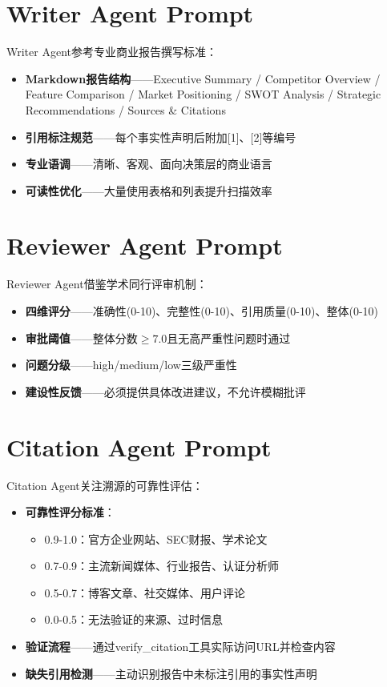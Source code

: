 \documentclass[12pt,a4paper]{ctexrep}
\begin{document}
\section{Writer Agent Prompt}

Writer Agent参考专业商业报告撰写标准：

\begin{itemize}
\item \textbf{Markdown报告结构}——Executive Summary / Competitor Overview / Feature Comparison / Market Positioning / SWOT Analysis / Strategic Recommendations / Sources \& Citations
\item \textbf{引用标注规范}——每个事实性声明后附加[1]、[2]等编号
\item \textbf{专业语调}——清晰、客观、面向决策层的商业语言
\item \textbf{可读性优化}——大量使用表格和列表提升扫描效率
\end{itemize}

\section{Reviewer Agent Prompt}

Reviewer Agent借鉴学术同行评审机制：

\begin{itemize}
\item \textbf{四维评分}——准确性(0-10)、完整性(0-10)、引用质量(0-10)、整体(0-10)
\item \textbf{审批阈值}——整体分数$\geq 7.0$且无高严重性问题时通过
\item \textbf{问题分级}——high/medium/low三级严重性
\item \textbf{建设性反馈}——必须提供具体改进建议，不允许模糊批评
\end{itemize}

\section{Citation Agent Prompt}

Citation Agent关注溯源的可靠性评估：

\begin{itemize}
\item \textbf{可靠性评分标准}：
\begin{itemize}
\item 0.9-1.0：官方企业网站、SEC财报、学术论文
\item 0.7-0.9：主流新闻媒体、行业报告、认证分析师
\item 0.5-0.7：博客文章、社交媒体、用户评论
\item 0.0-0.5：无法验证的来源、过时信息
\end{itemize}
\item \textbf{验证流程}——通过verify\_citation工具实际访问URL并检查内容
\item \textbf{缺失引用检测}——主动识别报告中未标注引用的事实性声明
\end{itemize}
\end{document}
